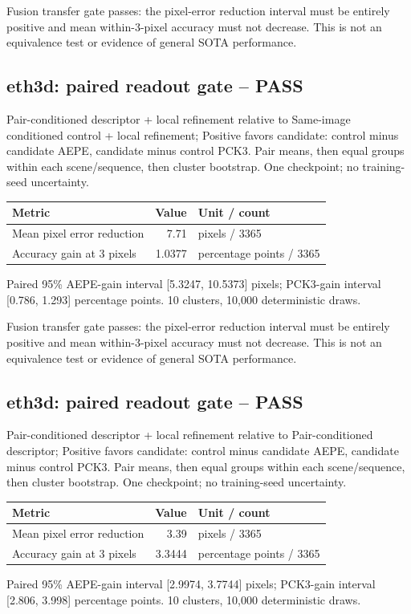 \documentclass[10pt]{article}
\begin{document}
Fusion transfer gate passes: the pixel-error reduction interval must be entirely positive and mean within-3-pixel accuracy must not decrease. This is not an equivalence test or evidence of general SOTA performance.

\subsection{eth3d: paired readout gate -- PASS}
Pair-conditioned descriptor + local refinement relative to Same-image conditioned control + local refinement; Positive favors candidate: control minus candidate AEPE, candidate minus control PCK3. Pair means, then equal groups within each scene/sequence, then cluster bootstrap. One checkpoint; no training-seed uncertainty.
\begin{center}\begin{tabular}{p{.57\linewidth}rp{.23\linewidth}}\toprule Metric & Value & Unit / count \\ \midrule
Mean pixel error reduction & 7.71 & pixels / 3365 \\
Accuracy gain at 3 pixels & 1.0377 & percentage points / 3365 \\
\bottomrule\end{tabular}\end{center}
Paired 95\% AEPE-gain interval [5.3247, 10.5373] pixels; PCK3-gain interval [0.786, 1.293] percentage points. 10 clusters, 10,000 deterministic draws.

Fusion transfer gate passes: the pixel-error reduction interval must be entirely positive and mean within-3-pixel accuracy must not decrease. This is not an equivalence test or evidence of general SOTA performance.

\subsection{eth3d: paired readout gate -- PASS}
Pair-conditioned descriptor + local refinement relative to Pair-conditioned descriptor; Positive favors candidate: control minus candidate AEPE, candidate minus control PCK3. Pair means, then equal groups within each scene/sequence, then cluster bootstrap. One checkpoint; no training-seed uncertainty.
\begin{center}\begin{tabular}{p{.57\linewidth}rp{.23\linewidth}}\toprule Metric & Value & Unit / count \\ \midrule
Mean pixel error reduction & 3.39 & pixels / 3365 \\
Accuracy gain at 3 pixels & 3.3444 & percentage points / 3365 \\
\bottomrule\end{tabular}\end{center}
Paired 95\% AEPE-gain interval [2.9974, 3.7744] pixels; PCK3-gain interval [2.806, 3.998] percentage points. 10 clusters, 10,000 deterministic draws.
\end{document}
